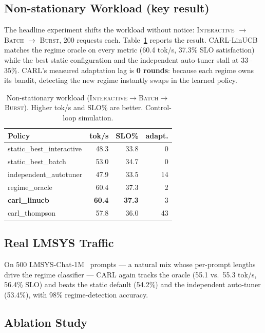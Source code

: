 \documentclass[10pt,twocolumn]{article}
\begin{document}
\subsection{Non-stationary Workload (key result)}
\label{sec:eval3}

The headline experiment shifts the workload without notice:
\textsc{Interactive} $\rightarrow$ \textsc{Batch} $\rightarrow$ \textsc{Burst},
200 requests each. Table~\ref{tab:nonstationary} reports the result. CARL-LinUCB
matches the regime oracle on every metric (60.4 tok/s, 37.3\% SLO satisfaction)
while the best static configuration and the independent auto-tuner stall at
33--35\%. CARL's measured adaptation lag is \textbf{0 rounds}: because each regime
owns its bandit, detecting the new regime instantly swaps in the learned policy.

\begin{table}[t]
\centering
\small
\caption{Non-stationary workload (\textsc{Interactive}$\rightarrow$\textsc{Batch}$\rightarrow$\textsc{Burst}).
Higher tok/s and SLO\% are better. Control-loop simulation.}
\label{tab:nonstationary}
\begin{tabular}{lrrr}
\toprule
Policy & tok/s & SLO\% & adapt. \\
\midrule
static\_best\_interactive   & 48.3 & 33.8 & 0 \\
static\_best\_batch         & 53.0 & 34.7 & 0 \\
independent\_autotuner      & 47.9 & 33.5 & 14 \\
regime\_oracle              & 60.4 & 37.3 & 2 \\
\textbf{carl\_linucb}       & \textbf{60.4} & \textbf{37.3} & 3 \\
carl\_thompson              & 57.8 & 36.0 & 43 \\
\bottomrule
\end{tabular}
\end{table}

\subsection{Real LMSYS Traffic}
\label{sec:eval4}

On 500 LMSYS-Chat-1M~\cite{zheng2023lmsys} prompts --- a natural mix whose
per-prompt lengths drive the regime classifier --- CARL again tracks the oracle
(55.1 vs.\ 55.3 tok/s, 56.4\% SLO) and beats the static default (54.2\%) and the
independent auto-tuner (53.4\%), with 98\% regime-detection accuracy.

\subsection{Ablation Study}
\label{sec:ablation}
\end{document}
